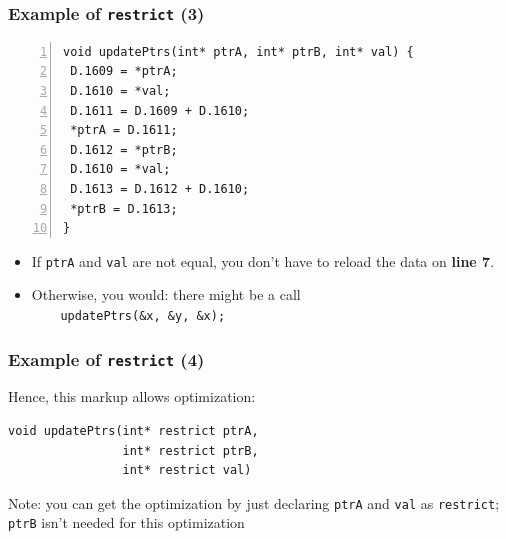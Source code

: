\documentclass[aspectratio=43]{beamer}
\newenvironment{changemargin}[1]{%
  \begin{list}{}{%
    \setlength{\topsep}{0pt}%
    \setlength{\leftmargin}{#1}%
    \setlength{\rightmargin}{1em}
    \setlength{\listparindent}{\parindent}%
    \setlength{\itemindent}{\parindent}%
    \setlength{\parsep}{\parskip}%
  }%
  \item[]}{\end{list}}
\begin{document}
\begin{frame}[fragile]
  \frametitle{Example of {\tt restrict} (3)}

  \begin{changemargin}{2.5cm}
  \begin{lstlisting}[numbers=left]
void updatePtrs(int* ptrA, int* ptrB, int* val) {
 D.1609 = *ptrA;
 D.1610 = *val;
 D.1611 = D.1609 + D.1610;
 *ptrA = D.1611;
 D.1612 = *ptrB;
 D.1610 = *val;
 D.1613 = D.1612 + D.1610;
 *ptrB = D.1613;
}
  \end{lstlisting}
  \begin{itemize}
    \item If {\tt ptrA} and {\tt val} are not equal, you don't have to
      reload the data on {\bf line 7}.
    \item Otherwise, you would: there might be a call\\{\tt ~~~~updatePtrs(\&x, \&y,
      \&x);}
  \end{itemize}
  \end{changemargin}
\end{frame}

\begin{frame}[fragile]
  \frametitle{Example of {\tt restrict} (4)}
  \begin{changemargin}{2.5cm}
  Hence, this markup allows optimization:
  \begin{lstlisting}
void updatePtrs(int* restrict ptrA, 
                int* restrict ptrB,
                int* restrict val)
  \end{lstlisting}
  Note: you can get the optimization by just declaring {\tt ptrA} and
      {\tt val} as {\tt restrict}; {\tt ptrB} isn't needed for this optimization
  \end{changemargin}
\end{frame}
\end{document}
